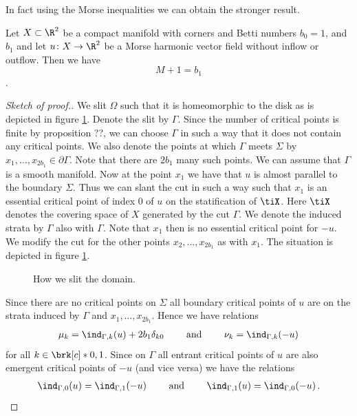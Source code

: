 In fact using the Morse inequalities we can obtain the stronger result.
\begin{proposition}
  Let $X\subset\R^2$ be a compact manifold with corners and Betti numbers $b_0=1$, and $b_1$
  and let $u\colon X\to\R^2$ be 
  a Morse harmonic vector field without inflow or outflow.
  Then we have $$M+1=b_1$$.
\end{proposition}
\begin{proof}[Sketch of proof.]
  We slit $\Omega$ such that it is homeomorphic to the disk as is 
  depicted in figure \ref{fi:n2_hvf_slitDomain}.
  Denote the slit by $\Gamma$. Since the number of critical points is 
  finite by proposition ??, we can choose $\Gamma$ in such a way that it does not contain
  any critical points.
   We also denote the points at which
  $\Gamma$ meets $\Sigma$ by $x_1,\dots,x_{2b_1}\in\partial\Gamma$.
  Note that there are $2b_1$ many such points.
  We can assume that $\Gamma$ is a smooth manifold. Now at the point $x_1$
  we have that $u$ is almost parallel to the boundary $\Sigma$. Thus we can slant
  the cut in such a way such that $x_1$ is an essential critical point of index $0$ of $u$ on the statification
  of $\tiX$. Here $\tiX$ denotes the covering space of $X$ generated by the cut $\Gamma$.
  We denote the induced strata by $\Gamma$ also with $\Gamma$. Note that $x_1$ then is no
  essential critical point for $-u$.
  We modify the cut for the other points $x_2,\dots,x_{2b_1}$ as with $x_1$.
  The situation is depicted in figure \ref{fi:n2_hvf_slitDomain}.
  \begin{figure}
    \centering
    
    \caption{How we slit the domain.}
    \label{fi:n2_hvf_slitDomain}
  \end{figure}
  Since there are no critical points on $\Sigma$ all boundary critical points of $u$ are on
  the strata induced by $\Gamma$ and $x_1,\dots,x_{2b_1}$. Hence we have relations
  \begin{align}
    \mu_k=\ind_{\Gamma,k}(u)+2b_1\delta_{k0} \qquad\text{ and }\qquad
    \nu_k=\ind_{\Gamma,k}(-u)\label{eq:n2_hvf_noInflowNoOutflow_relationsMuIndex}
  \end{align}
  for all $k\in\brk[c]*{0,1}$.
  Since on $\Gamma$ all entrant critical points of $u$ are also emergent
  critical points of $-u$ (and vice versa) we have the relations
  \begin{align}
    \ind_{\Gamma,0}(u)=\ind_{\Gamma,1}(-u) \qquad\text{ and }\qquad
    \ind_{\Gamma,1}(u)=\ind_{\Gamma,0}(-u)\,.\label{eq:n2_hvf_noInflowNoOutflow_relationsIndex}

\end{align}
\end{proof}
